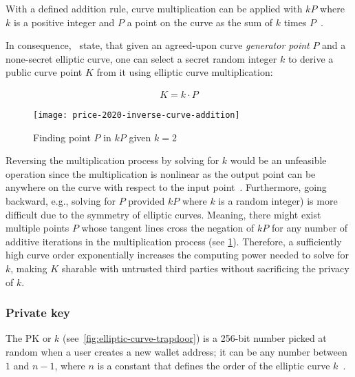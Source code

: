 With a defined addition rule, curve multiplication can be applied with $kP$ where $k$ is a positive integer and $P$ a point on the curve as the sum of $k$ times $P$~\autocite[5]{kapoor_elliptic_2008}.

In consequence,~\textcites[65,68]{antonopoulos_mastering_2017}[5]{kapoor_elliptic_2008} state, that given an agreed-upon curve \emph{generator point} $P$ and a none-secret elliptic curve, one can select a secret random integer $k$ to derive a public curve point $K$ from it using elliptic curve multiplication:

\begin{align}\label{eq:curve-multiplication}
    K=k \cdot P
\end{align}

\begin{figure}[H]
    \caption{Finding point $P$ in $kP$ given $k=2$}
    \label{fig:finding-point-p}
    \begin{center}
        \texttt{[image: price-2020-inverse-curve-addition]}
    \end{center}
\end{figure}

Reversing the multiplication process by solving for $k$ would be an unfeasible operation since the multiplication is nonlinear as the output point can be anywhere on the curve with respect to the input point~\autocite{price_bitcoins_2020}.
Furthermore, going backward, e.g., solving for $P$ provided $kP$ where $k$ is a random integer) is more difficult due to the symmetry of elliptic curves.
Meaning, there might exist multiple points $P$ whose tangent lines cross the negation of $kP$ for any number of additive iterations in the multiplication process (see \cref{fig:finding-point-p}).
Therefore, a sufficiently high curve order exponentially increases the computing power needed to solve for $k$, making $K$ sharable with untrusted third parties without sacrificing the privacy of $k$.

\subsubsection{Private key}\label{subsubsec:private-key}

The \gls{PK} or $k$ (see~\cref{fig:elliptic-curve-trapdoor}) is a 256-bit number picked at random when a user creates a new wallet address;
it can be any number between $1$ and $n-1$, where $n$ is a constant that defines the order of the elliptic curve $k$~\autocite[63]{antonopoulos_mastering_2017}.

